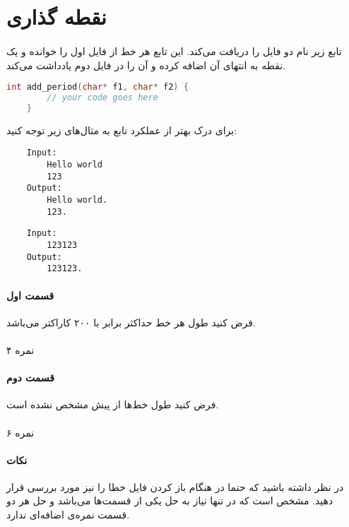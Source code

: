 \documentclass[../main.tex]{subfiles}
\begin{document}
\section{نقطه گذاری}
\paragraph{}
تابع زیر نام دو فایل را دریافت می‌کند.
این تابع هر خط از فایل اول را خوانده و یک نقطه
به انتهای آن اضافه کرده و آن را در فایل دوم یادداشت می‌کند.

\begin{latin}
\begin{lstlisting}[language=c]
    int add_period(char* f1, char* f2) {
        // your code goes here
    }
\end{lstlisting}
\end{latin}

برای درک بهتر از عملکرد تابع به مثال‌های زیر توجه کنید:

\begin{latin}
\begin{verbatim}
    Input:
        Hello world
        123
    Output:
        Hello world.
        123.
\end{verbatim}

\begin{verbatim}
    Input:
        123123
    Output:
        123123.
\end{verbatim}
\end{latin}

\paragraph{قسمت اول}
فرض کنید طول هر خط حداکثر برابر با ۲۰۰ کاراکتر می‌باشد.

\paragraph{}
۴ نمره

\paragraph{قسمت دوم}
فرض کنید طول خط‌ها از پیش مشخص نشده است.

\paragraph{}
۶ نمره

\paragraph{نکات}
در نظر داشته باشید که حتما در هنگام باز کردن فایل خطا را نیز مورد بررسی قرار دهید.
مشخص است که در تنها نیاز به حل یکی از قسمت‌ها می‌باشد و حل هر دو قسمت نمره‌ی اضافه‌ای ندارد.
\end{document}

